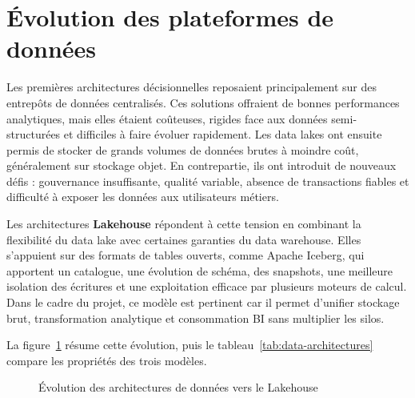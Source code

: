\section{Évolution des plateformes de données}

Les premières architectures décisionnelles reposaient principalement sur des entrepôts de données centralisés. Ces solutions offraient de bonnes performances analytiques, mais elles étaient coûteuses, rigides face aux données semi-structurées et difficiles à faire évoluer rapidement. Les data lakes ont ensuite permis de stocker de grands volumes de données brutes à moindre coût, généralement sur stockage objet. En contrepartie, ils ont introduit de nouveaux défis : gouvernance insuffisante, qualité variable, absence de transactions fiables et difficulté à exposer les données aux utilisateurs métiers.

Les architectures \textbf{Lakehouse} répondent à cette tension en combinant la flexibilité du data lake avec certaines garanties du data warehouse. Elles s'appuient sur des formats de tables ouverts, comme Apache Iceberg, qui apportent un catalogue, une évolution de schéma, des snapshots, une meilleure isolation des écritures et une exploitation efficace par plusieurs moteurs de calcul. Dans le cadre du projet, ce modèle est pertinent car il permet d'unifier stockage brut, transformation analytique et consommation BI sans multiplier les silos.

La figure~\ref{fig:evolution-plateformes-data} résume cette évolution, puis le tableau~\ref{tab:data-architectures} compare les propriétés des trois modèles.

\begin{figure}[H]
\centering
{}
\caption{Évolution des architectures de données vers le Lakehouse}
\label{fig:evolution-plateformes-data}
\end{figure}

